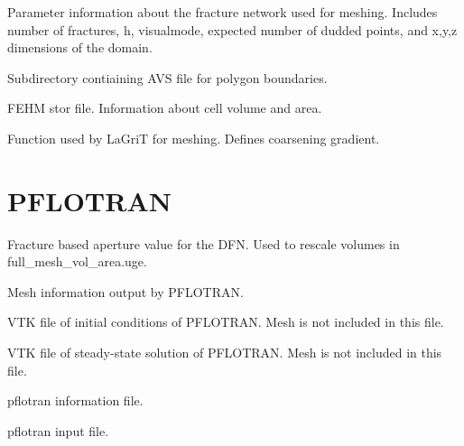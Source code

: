 \documentclass[letterpaper,10pt,english]{sphinxmanual}
\begin{document}

\label{\detokenize{output:params-txt}}
Parameter information about the fracture network used for meshing. Includes number of fractures, h, visualmode, expected number of dudded points, and x,y,z dimensions of the domain.


\label{\detokenize{output:polys}}
Subdirectory contiaining AVS file for polygon boundaries.


\label{\detokenize{output:tri-fracture-stor}}
FEHM stor file. Information about cell volume and area.


\label{\detokenize{output:user-function-lgi}}
Function used by LaGriT for meshing. Defines coarsening gradient.


\section{PFLOTRAN}
\label{\detokenize{output:id3}}

\label{\detokenize{output:aperture-dat}}
Fracture based aperture value for the DFN. Used to rescale volumes in full\_mesh\_vol\_area.uge.


\label{\detokenize{output:cellinfo-dat}}
Mesh information output by PFLOTRAN.


\label{\detokenize{output:dfn-explicit-000-vtk}}
VTK file of initial conditions of PFLOTRAN. Mesh is not included in this file.


\label{\detokenize{output:dfn-explicit-001-vtk}}
VTK file of steady-state solution of PFLOTRAN. Mesh is not included in this file.


\label{\detokenize{output:dfn-explicit-mas-dat}}
pflotran information file.


\label{\detokenize{output:dfn-explicit-in}}
pflotran input file.
\end{document}
